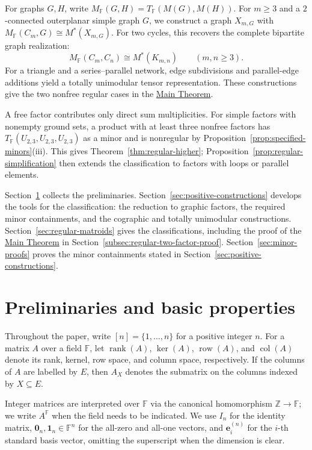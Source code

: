 \documentclass[12pt,a4paper]{article}
\numberwithin{equation}{section}
\DeclareMathOperator{\rank}{rank}
\DeclareMathOperator{\col}{col}
\DeclareMathOperator{\row}{row}
\newcommand{\F}{\mathbb F}
\newcommand{\mainthm}{\hyperref[thm:regular-two-factor]{Main Theorem}}
\theoremstyle{definition}
\theoremstyle{remark}
\begin{document}
For graphs \(G,H\), write
\(M_{\F}(G,H)=T_{\F}(M(G),M(H))\).  For \(m\ge3\) and a
\(2\)-connected outerplanar simple graph \(G\), we construct a graph \(X_{m,G}\) with
\(M_{\F}(C_m,G)\cong M^*(X_{m,G})\).  For two cycles, this recovers
the complete bipartite graph realization:
\[
 M_{\F}(C_m,C_n)\cong M^*(K_{m,n})\qquad(m,n\ge3).
\]
For a triangle and a series--parallel network, edge subdivisions and
parallel-edge additions yield a totally unimodular tensor
representation.  These constructions give the two nonfree regular cases in
the \mainthm{}.

A free factor contributes only direct sum multiplicities.  For simple
factors with nonempty ground sets, a product with at least three nonfree
factors has
\(T_{\F}(U_{2,3},U_{2,3},U_{2,3})\) as a minor and is nonregular by
Proposition~\ref{prop:specified-minors}\textup{(iii)}.  This gives
Theorem~\ref{thm:regular-higher};
Proposition~\ref{prop:regular-simplification} then extends the
classification to factors with loops or parallel elements.

Section~\ref{sec:preliminaries} collects the preliminaries.
Section~\ref{sec:positive-constructions} develops the tools for the
classification: the reduction to graphic factors, the required minor
containments, and the cographic and totally unimodular constructions.
Section~\ref{sec:regular-matroids} gives the classifications,
including the proof of the \mainthm{} in
Section~\ref{subsec:regular-two-factor-proof}.
Section~\ref{sec:minor-proofs} proves the minor containments stated
in Section~\ref{sec:positive-constructions}.

\section{Preliminaries and basic properties}\label{sec:preliminaries}
Throughout the paper, write \([n]=\{1,\ldots,n\}\) for a positive
integer \(n\).  For a matrix \(A\) over a field \(\F\), let
\(\rank(A)\), \(\ker(A)\), \(\row(A)\), and \(\col(A)\)
denote its rank, kernel, row space, and column space, respectively.
If the columns of \(A\) are labelled by \(E\), then \(A_X\)
denotes the submatrix on the columns indexed by \(X\subseteq E\).

Integer matrices are interpreted over \(\F\) via the canonical
homomorphism \(\mathbb Z\to\F\); we write \(A^{\F}\) when
the field needs to be indicated.  We use \(I_n\) for the identity
matrix, \(\boldsymbol{0}_n,\boldsymbol{1}_n\in\F^n\) for the
all-zero and all-one vectors, and \(\boldsymbol{e}_i^{(n)}\) for
the \(i\)-th standard basis vector, omitting the superscript when
the dimension is clear.
\end{document}
